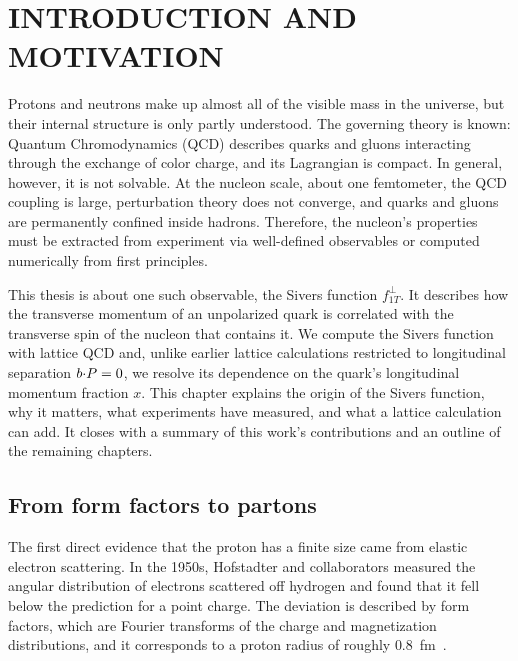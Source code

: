 \section{INTRODUCTION AND MOTIVATION}
\label{sec:intro}

Protons and neutrons make up almost all of the visible mass in the universe, but their internal structure is only partly understood.
The governing theory is known: Quantum Chromodynamics (QCD) describes quarks and gluons interacting through the exchange of color charge, and its Lagrangian is compact. In general, however, it is not solvable. At the nucleon scale, about one femtometer, the QCD coupling is large, perturbation theory does not converge, and quarks and gluons are permanently confined inside hadrons. Therefore, the nucleon's properties must be extracted from experiment via well-defined observables or computed numerically from first principles.

This thesis is about one such observable, the Sivers function $f_{1T}^\perp$. It describes how the transverse momentum of an unpolarized quark is correlated with the transverse spin of the nucleon that contains it. We compute the Sivers function with lattice QCD and, unlike earlier lattice calculations restricted to longitudinal separation $b{\cdot} P=0$, we resolve its dependence on the quark's longitudinal momentum fraction $x$. This chapter explains the origin of the Sivers function, why it matters, what experiments have measured, and what a lattice calculation can add. It closes with a summary of this work's contributions and an outline of the remaining chapters.

\subsection{From form factors to partons}
\label{sec:intro_partons}

The first direct evidence that the proton has a finite size came from elastic electron scattering. In the 1950s, Hofstadter and collaborators measured the angular distribution of electrons scattered off hydrogen and found that it fell below the prediction for a point charge. The deviation is described by form factors, which are Fourier transforms of the charge and magnetization distributions, and it corresponds to a proton radius of roughly $0.8$~fm~\cite{Hofstadter:1956qs}.


